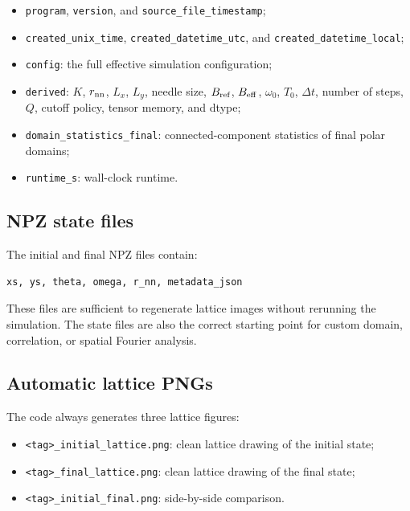 \documentclass[11pt,a4paper]{article}
\newcommand{\code}[1]{\texttt{#1}}
\begin{document}
\begin{itemize}[leftmargin=*]
    \item \code{program}, \code{version}, and \code{source\_file\_timestamp};
    \item \code{created\_unix\_time}, \code{created\_datetime\_utc}, and \code{created\_datetime\_local};
    \item \code{config}: the full effective simulation configuration;
    \item \code{derived}: $K$, $r_{\rm nn}$, $L_x$, $L_y$, needle size, $B_{\rm ref}$, $B_{\rm eff}$, $\omega_0$, $T_0$, $\Delta t$, number of steps, $Q$, cutoff policy, tensor memory, and dtype;
    \item \code{domain\_statistics\_final}: connected-component statistics of final polar domains;
    \item \code{runtime\_s}: wall-clock runtime.
\end{itemize}

\subsection{NPZ state files}

The initial and final NPZ files contain:

\begin{lstlisting}
xs, ys, theta, omega, r_nn, metadata_json
\end{lstlisting}

These files are sufficient to regenerate lattice images without rerunning the simulation. The state files are also the correct starting point for custom domain, correlation, or spatial Fourier analysis.

\subsection{Automatic lattice PNGs}

The code always generates three lattice figures:

\begin{itemize}[leftmargin=*]
    \item \code{<tag>\_initial\_lattice.png}: clean lattice drawing of the initial state;
    \item \code{<tag>\_final\_lattice.png}: clean lattice drawing of the final state;
    \item \code{<tag>\_initial\_final.png}: side-by-side comparison.
\end{itemize}
\end{document}
